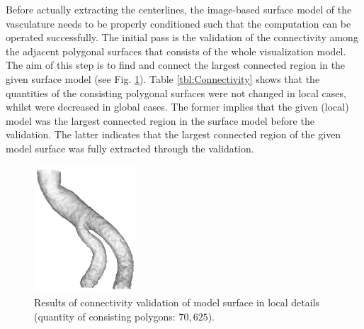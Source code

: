 Before actually extracting the centerlines, the image-based surface model of the vasculature needs to be properly conditioned such that the computation can be operated successfully. %
The initial pass is the validation of the connectivity among the adjacent polygonal surfaces that consists of the whole visualization model.
The aim of this step is to find and connect the largest connected region in the given surface model (see Fig. \ref{fig:ConnectivityLocal}).
Table \ref{tbl:Connectivity} shows that the quantities of the consisting polygonal surfaces were not changed in local cases, whilst were decreased in global cases.
The former implies that the given (local) model was the largest connected region in the surface model before the validation.
The latter indicates that the largest connected region of the given model surface was fully extracted through the validation.
\begin{figure}[t]
\centering
\includegraphics[width=1.5in]{Figures/connectivity_local.png}
\caption{Results of connectivity validation of model surface in local details (quantity of consisting polygons: $70,625$).}
\label{fig:ConnectivityLocal}
\end{figure}

